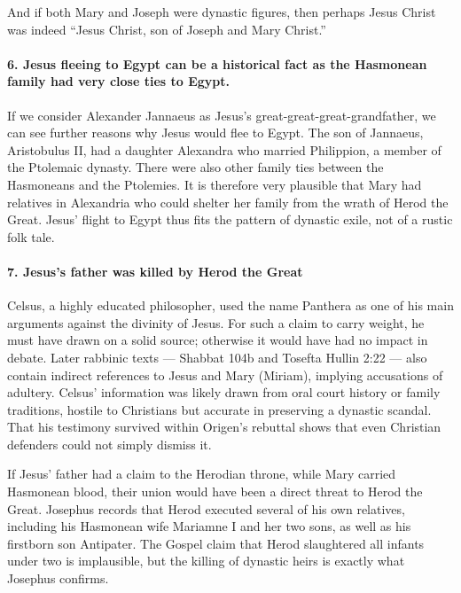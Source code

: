 And if both Mary and Joseph were dynastic figures, then perhaps Jesus Christ was indeed “Jesus Christ, son of Joseph and Mary Christ.”

\paragraph{6.
Jesus fleeing to Egypt can be a historical fact as the Hasmonean family had very close ties to Egypt.}\label{par:jesus-fleeing-to-egypt-can-be-a-historical-fact-as-the-hasmonean-family-had-very-close-ties-to-egypt.}

If we consider Alexander Jannaeus as Jesus’s great-great-great-grandfather, we can see further reasons why Jesus would flee to Egypt.
The son of Jannaeus, Aristobulus II, had a daughter Alexandra who married Philippion, a member of the Ptolemaic dynasty.
There were also other family ties between the Hasmoneans and the Ptolemies.
It is therefore very plausible that Mary had relatives in Alexandria who could shelter her family from the wrath of Herod the Great.
Jesus’ flight to Egypt thus fits the pattern of dynastic exile, not of a rustic folk tale.

\paragraph{7.
Jesus's father was killed by Herod the Great}\label{par:jesuss-father-was-killed-by-herod-the-great}

Celsus, a highly educated philosopher, used the name Panthera as one of his main arguments against the divinity of Jesus.
For such a claim to carry weight, he must have drawn on a solid source; otherwise it would have had no impact in debate.
Later rabbinic texts — Shabbat 104b and Tosefta Hullin 2:22 — also contain indirect references to Jesus and Mary (Miriam), implying accusations of adultery.
Celsus’ information was likely drawn from oral court history or family traditions, hostile to Christians but accurate in preserving a dynastic scandal.
That his testimony survived within Origen’s rebuttal shows that even Christian defenders could not simply dismiss it.

If Jesus’ father had a claim to the Herodian throne, while Mary carried Hasmonean blood, their union would have been a direct threat to Herod the Great.
Josephus records that Herod executed several of his own relatives, including his Hasmonean wife Mariamne I and her two sons, as well as his firstborn son Antipater.
The Gospel claim that Herod slaughtered all infants under two is implausible, but the killing of dynastic heirs is exactly what Josephus confirms.


